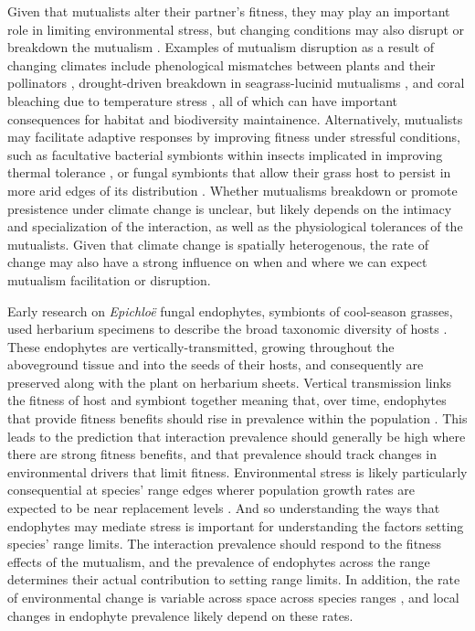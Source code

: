 \documentclass[11pt]{article}
\begin{document}
Given that mutualists alter their partner's fitness, they may play an important role in limiting environmental stress, but changing conditions may also disrupt or breakdown the mutualism \citep{aslan2013mutualism}. 
Examples of mutualism disruption as a result of changing climates include phenological mismatches between plants and their pollinators \citep{pauw2011reconstruction}, drought-driven breakdown in seagrass-lucinid mutualisms \citep{de2016drought}, and coral bleaching due to temperature stress \citep{sully2019global}, all of which can have important consequences for habitat and biodiversity maintainence. 
Alternatively, mutualists may facilitate adaptive responses by improving fitness under stressful conditions, such as facultative bacterial symbionts within insects implicated in improving thermal tolerance \citep{truitt2019wolbachia, renoz2019evolutionary}, or fungal symbionts that allow their grass host to persist in more arid edges of its distribution \citep{afkhami2014mutualist}. 
Whether mutualisms breakdown or promote presistence under climate change is unclear, but likely depends on the intimacy and specialization of the interaction, as well as the physiological tolerances of the mutualists\citep{toby2010mutualisms, warren2014mutualism, rafferty2015phenological}. 
Given that climate change is spatially heterogenous, the rate of change may also have a strong influence on when and where we can expect mutualism facilitation or disruption. 

Early research on \emph{Epichloë} fungal endophytes, symbionts of cool-season grasses, used herbarium specimens to describe the broad taxonomic diversity of hosts \citep{white1985endophyte}. 
These endophytes are vertically-transmitted, growing throughout the aboveground tissue and into the seeds of their hosts, and consequently are preserved along with the plant on herbarium sheets. 
Vertical transmission links the fitness of host and symbiont together meaning that, over time, endophytes that provide fitness benefits should rise in prevalence within the population \citep{fine1975vectors, douglas1998host, rudgers2009fungus}. 
This leads to the prediction that interaction prevalence should generally be high where there are strong fitness benefits, and that prevalence should track changes in environmental drivers that limit fitness. 
Environmental stress is likely particularly consequential at species' range edges wherer population growth rates are expected to be near replacement levels \cite{}. 
And so understanding the ways that endophytes may mediate stress is important for understanding the factors setting species' range limits. 
The interaction prevalence should respond to the fitness effects of the mutualism, and the prevalence of endophytes across the range determines their actual contribution to setting range limits. 
In addition, the rate of environmental change is variable across space across species ranges \citep{IPCC2012managing}, and local changes in endophyte prevalence likely depend on these rates. 
\end{document}
